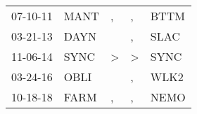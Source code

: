 \begin{supertabular}{p{0.07\textwidth}p{0.06\textwidth}p{0.02\textwidth}p{0.02\textwidth}p{0.06\textwidth}}
 07-10-11\textsuperscript{} &           MANT\textsuperscript{} &                , &             , &           BTTM\textsuperscript{} \\
 03-21-13\textsuperscript{} &           DAYN\textsuperscript{} &                  &             , &           SLAC\textsuperscript{} \\
 11-06-14\textsuperscript{} &           SYNC\textsuperscript{} &     \textgreater &  \textgreater &           SYNC\textsuperscript{} \\
 03-24-16\textsuperscript{} &           OBLI\textsuperscript{} &                  &             , &           WLK2\textsuperscript{} \\
 10-18-18\textsuperscript{} &           FARM\textsuperscript{} &                , &             , &           NEMO\textsuperscript{} \\
\end{supertabular}
